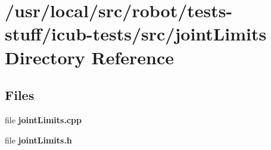 \section{/usr/local/src/robot/tests-\/stuff/icub-\/tests/src/joint\-Limits Directory Reference}
\label{dir_aa24f5f4cb7032c525c0aa59975659d0}
\subsection*{Files}
\begin{DoxyCompactItemize}
\item 
file {\bfseries joint\-Limits.\-cpp}
\item 
file {\bfseries joint\-Limits.\-h}
\end{DoxyCompactItemize}
